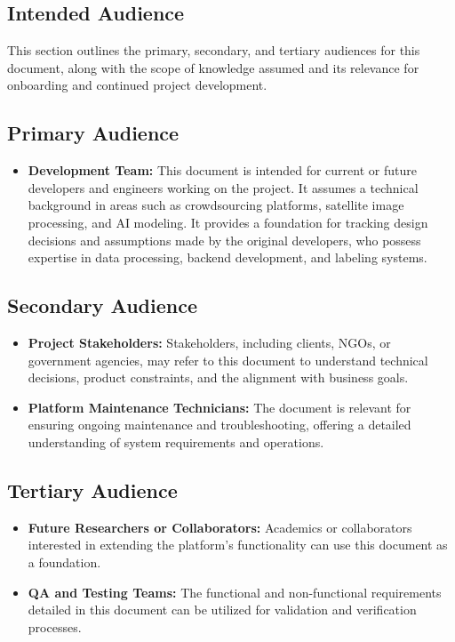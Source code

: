 \documentclass{article}
\begin{document}
\subsection{Intended Audience}

This section outlines the primary, secondary, and tertiary audiences for this document, along with the scope of knowledge assumed and its relevance for onboarding and continued project development.

\subsection{Primary Audience}
\begin{itemize}
    \item \textbf{Development Team:} This document is intended for current or future developers and engineers working on the project. It assumes a technical background in areas such as crowdsourcing platforms, satellite image processing, and AI modeling. It provides a foundation for tracking design decisions and assumptions made by the original developers, who possess expertise in data processing, backend development, and labeling systems.
\end{itemize}

\subsection{Secondary Audience}
\begin{itemize}
    \item \textbf{Project Stakeholders:} Stakeholders, including clients, NGOs, or government agencies, may refer to this document to understand technical decisions, product constraints, and the alignment with business goals.
    \item \textbf{Platform Maintenance Technicians:} The document is relevant for ensuring ongoing maintenance and troubleshooting, offering a detailed understanding of system requirements and operations.
\end{itemize}

\subsection{Tertiary Audience}
\begin{itemize}
    \item \textbf{Future Researchers or Collaborators:} Academics or collaborators interested in extending the platform’s functionality can use this document as a foundation.
    \item \textbf{QA and Testing Teams:} The functional and non-functional requirements detailed in this document can be utilized for validation and verification processes.
\end{itemize}
\end{document}
